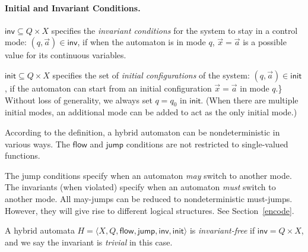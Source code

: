 \documentclass[envcountsect]{llncs}
\newcommand{\flow}{\mathsf{flow}}
\newcommand{\jump}{\mathsf{jump}}
\newcommand{\inv}{\mathsf{inv}}
\newcommand{\init}{\mathsf{init}}
\begin{document}
\begin{definition}
\paragraph{\bf Initial and Invariant Conditions.} $\inv \subseteq Q\times X$
specifies the {\em invariant conditions} for
the system to stay in a control mode: $(q,\vec a)\in \inv$, if when the
automaton is in mode $q$, $\vec x = \vec a$ is a possible value for its
continuous variables.

$\init \subseteq Q\times X$ specifies the set of {\em
initial configurations} of the system: $(q, \vec a)\in \init$, if the
automaton can start from an initial configuration $\vec x = \vec a$ in mode
$q$.\} Without loss of generality, we always set $q=q_0$ in $\init$. (When there
are multiple initial modes, an additional mode can be
added to act as the only initial mode.)
\end{definition}
According to the definition, a hybrid automaton can be nondeterministic in
various ways.  The $\flow$ and $\jump$ conditions are not
restricted to single-valued functions.
\begin{remark}[$\jump$ vs $\inv$] The jump conditions specify when an automaton
{\em may}  switch to another mode. The invariants (when violated) specify when
an automaton {\em must} switch to another mode. All may-jumps can
be reduced to nondeterministic must-jumps. However, they will give rise to
different logical structures. See Section~\ref{encode}. 
\end{remark}
\begin{definition}
A hybrid automata $H = \langle X, Q, \flow, \jump, \inv, \init\rangle$ is
 {\em invariant-free} if $\inv = Q\times X$, and we say the invariant is {\em
trivial} in this case.
\end{definition}
\end{document}
